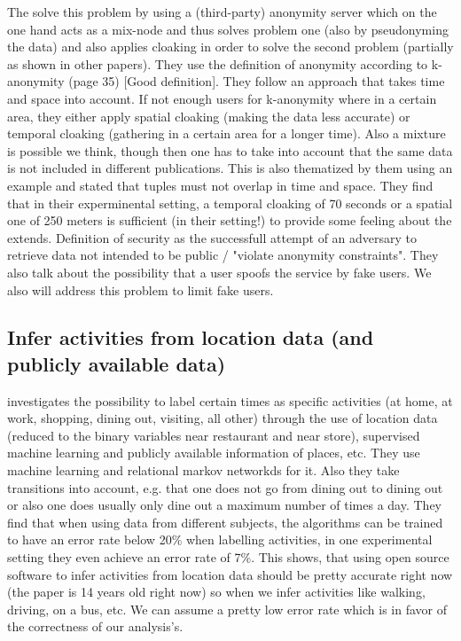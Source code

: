 The solve this problem by using a (third-party) anonymity server which on the one hand acts as a mix-node and thus solves problem one (also by pseudonyming the data) and also applies cloaking in order to solve the second problem (partially as shown in other papers). They use the definition of anonymity according to k-anonymity (page 35) [Good definition]. They follow an approach that takes time and space into account. If not enough users for k-anonymity where in a certain area, they either apply spatial cloaking (making the data less accurate) or temporal cloaking (gathering in a certain area for a longer time). Also a mixture is possible we think, though then one has to take into account that the same data is not included in different publications. This is also thematized by them using an example and stated that tuples must not overlap in time and space. They find that in their experminental setting, a temporal cloaking of 70 seconds or a spatial one of 250 meters is sufficient (in their setting!) to provide some feeling about the extends. Definition of security as the successfull attempt of an adversary to retrieve data not intended to be public / "violate anonymity constraints". They also talk about the possibility that a user spoofs the service by fake users. We also will address this problem to limit fake users.

\subsection{Infer activities from location data (and publicly available data)}

\parencite{liao2005location} investigates the possibility to label certain times as specific activities (at home, at work, shopping, dining out, visiting, all other) through the use of location data (reduced to the binary variables near restaurant and near store), supervised machine learning and publicly available information of places, etc. They use machine learning and relational markov networkds for it. Also they take transitions into account, e.g. that one does not go from dining out to dining out or also one does usually only dine out a maximum number of times a day. They find that when using data from different subjects, the algorithms can be trained to have an error rate below 20\% when labelling activities, in one experimental setting they even achieve an error rate of 7\%. This shows, that using open source software to infer activities from location data should be pretty accurate right now (the paper is 14 years old right now) so when we infer activities like walking, driving, on a bus, etc. We can assume a pretty low error rate which is in favor of the correctness of our analysis's.

